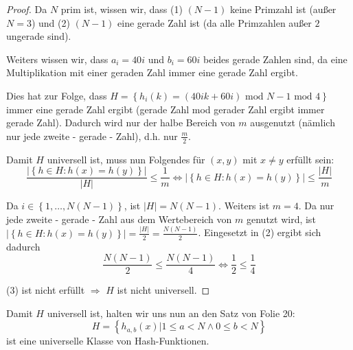 \documentclass{article}
\begin{document}
\begin{proof}
Da $N$ prim ist, wissen wir, dass (1) $(N - 1)$ keine Primzahl ist (au{\ss}er
$N = 3$) und (2) $(N - 1)$ eine gerade Zahl ist (da alle Primzahlen au{\ss}er
$2$ ungerade sind).

Weiters wissen wir, dass $a_i = 40i$ und $b_i=60i$ beides gerade Zahlen sind,
da eine Multiplikation mit einer geraden Zahl immer eine gerade Zahl ergibt.


Dies hat zur Folge, dass
$H = \left\{ h_i \left( k \right) = \left( 40ik + 60i \right)\text{ mod } N - 1 \text{ mod } 4 \right\}$
immer eine gerade Zahl ergibt (gerade Zahl mod gerader Zahl ergibt immer gerade
Zahl). Dadurch wird nur der halbe Bereich von $m$ ausgenutzt (n{\"a}mlich nur
jede zweite - gerade - Zahl), d.h. nur $\frac{m}{2}$.

Damit $H$ universell ist, muss nun Folgendes f{\"u}r $\left( x, y \right)$ mit
$x \neq y$ erf{\"u}llt sein:
\begin{equation}
  \frac{|\left\{ h \in H: h\left( x \right) = h\left( y \right) \right\}|}{|H|} \leq \frac{1}{m}
  \Longleftrightarrow
  |\left\{ h \in H: h\left( x \right) = h\left( y \right) \right\}| \leq \frac{|H|}{m}
\end{equation}

Da $i \in \left\{ 1, \ldots, N \left( N - 1 \right) \right\}$, ist
$|H| = N \left( N - 1 \right)$. Weiters ist $m = 4$. Da nur jede zweite -
gerade - Zahl aus dem Wertebereich von $m$ genutzt wird, ist
$|\left\{ h \in H: h\left( x \right) = h\left( y \right) \right\}| = \frac{|H|}{2} = \frac{N \left( N - 1 \right)}{2}$.
Eingesetzt in (2) ergibt sich dadurch
\begin{equation}
  \frac{N \left( N - 1 \right)}{2} \leq \frac{N \left( N - 1 \right)}{4}
  \Longleftrightarrow
  \frac{1}{2} \leq \frac{1}{4}
\end{equation}

(3) ist nicht erf{\"u}llt $\Rightarrow$ $H$ ist nicht universell.
\end{proof}

Damit $H$ universell ist, halten wir uns nun an den Satz von Folie 20:
\begin{equation}
  H = \left\{ h_{a, b} \left( x \right) | 1 \leq a < N \land 0 \leq b < N \right\}
\end{equation}
ist eine universelle Klasse von Hash-Funktionen.
\end{document}

